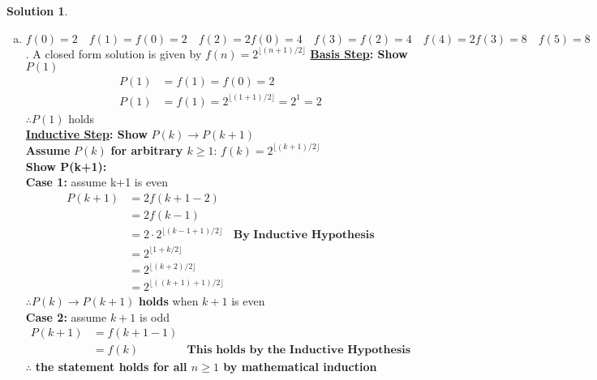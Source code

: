 \documentclass{article}
\theoremstyle{definition}
\newtheorem*{solution}{Solution}
\begin{document}
\begin{solution}
\begin{enumerate}[a)]
  \item $ f(0) = 2 \quad f(1) = f(0) = 2 \quad f(2) = 2f(0) = 4 \quad f(3) = f(2) = 4 \quad f(4) = 2f(3) = 8 \quad f(5) = 8 \quad f(6) = 16 \quad f(7) = 16$. A closed form solution is given by $f(n) = 2^{\lfloor (n+1)/2 \rfloor}$
  \textbf{\underline{Basis Step}: Show }$P(1)$ \\
  \begin{align*}
  P(1) &= f(1) = f(0) = 2 \\
  P(1) &= f(1) = 2^{\lfloor (1+1)/2 \rfloor} = 2^1 = 2
  \end{align*}
  $\therefore P(1)$ holds \\
  \textbf{\underline{Inductive Step}: Show } $P(k) \rightarrow P(k+1)$ \\
  \textbf{Assume} $P(k)$ \textbf{for arbitrary $k \ge  1$}: $f(k) = 2^{\lfloor (k+1)/2 \rfloor}$ \\
  \textbf{Show P(k+1):} \\
  \textbf{Case 1:} assume k+1 is even
  \begin{align*}
    P(k+1) &= 2f(k+1 - 2) \\
    &= 2f(k - 1) \\
    &= 2 \cdot 2^{\lfloor (k - 1 +1)/2 \rfloor} &\textbf{By Inductive Hypothesis}\\
    &= 2^{\lfloor 1 + k/2 \rfloor} \\
    &= 2^{\lfloor (k+2)/2 \rfloor} \\
    &= 2^{\lfloor ((k+1) + 1)/2 \rfloor}
  \end{align*}
  $\therefore P(k) \rightarrow P(k+1)$ \textbf{holds} when $k+1$ is even\\
  \textbf{Case 2:} assume $k+1$ is odd
  \begin{align*}
    P(k+1) &= f(k+1 - 1) \\
    &= f(k) &\textbf{This holds by the Inductive Hypothesis}
  \end{align*}
  $\therefore$ \textbf{the statement holds for all $n \ge 1 $ by mathematical induction}
\end{enumerate}
\end{solution}
\end{document}
